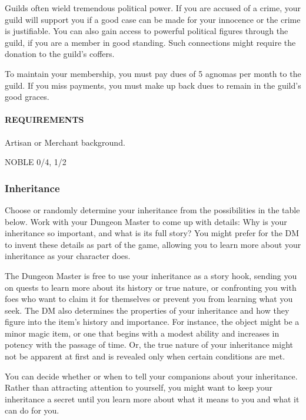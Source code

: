         Guilds often wield tremendous political power.
        If you are accused of a crime, your guild will support you if a good case can be made for your innocence or the crime is justifiable.
        You can also gain access to powerful political figures through the guild, if you are a member in good standing.
        Such connections might require the donation to the guild's coffers.

        To maintain your membership, you must pay dues of 5 agnomas per month to the guild.
        If you miss payments, you must make up back dues to remain in the guild's good graces.
        \paragraph{REQUIREMENTS} Artisan or Merchant background.

NOBLE 0/4, 1/2
    \subsubsection{Inheritance} \label{feat::inheritance}
    Choose or randomly determine your inheritance from the possibilities in the table below.
    Work with your Dungeon Master to come up with details: Why is your inheritance so important, and what is its full story?
    You might prefer for the DM to invent these details as part of the game, allowing you to learn more about your inheritance as your character does.

    The Dungeon Master is free to use your inheritance as a story hook, sending you on quests to learn more about its history or true nature, or confronting you with foes who want to claim it for themselves or prevent you from learning what you seek.
    The DM also determines the properties of your inheritance and how they figure into the item's history and importance.
    For instance, the object might be a minor magic item, or one that begins with a modest ability and increases in potency with the passage of time.
    Or, the true nature of your inheritance might not be apparent at first and is revealed only when certain conditions are met.

    You can decide whether or when to tell your companions about your inheritance.
    Rather than attracting attention to yourself, you might want to keep your inheritance a secret until you learn more about what it means to you and what it can do for you.

